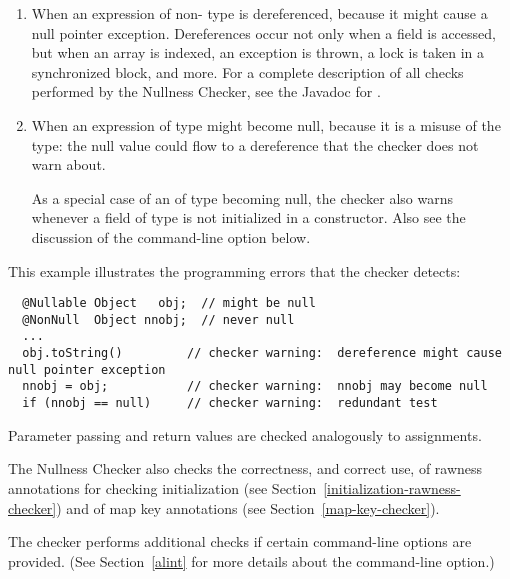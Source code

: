 \begin{enumerate}

\item
  When an expression of non- type
  is dereferenced, because it might cause a null pointer exception.
  Dereferences occur not only when a field is accessed, but when an array
  is indexed, an exception is thrown, a lock is taken in a synchronized
  block, and more.  For a complete description of all checks performed by
  the Nullness Checker, see the Javadoc for
  .

\item
  When an expression of  type
  might become null, because it
  is a misuse of the type:  the null value could flow to a dereference that
  the checker does not warn about.

  As a special case of an of 
  type becoming null, the checker also warns whenever a field of
   type is not initialized in a
  constructor.  Also see the discussion of the 
  command-line option below.

\end{enumerate}

This example illustrates the programming errors that the checker detects:

\begin{Verbatim}
  @Nullable Object   obj;  // might be null
  @NonNull  Object nnobj;  // never null
  ...
  obj.toString()         // checker warning:  dereference might cause null pointer exception
  nnobj = obj;           // checker warning:  nnobj may become null
  if (nnobj == null)     // checker warning:  redundant test
\end{Verbatim}

Parameter passing and return values are checked analogously to assignments.

The Nullness Checker also checks the correctness, and correct use, of
rawness annotations for checking initialization (see
Section~\ref{initialization-rawness-checker}) and of map key annotations (see
Section~\ref{map-key-checker}).


The checker performs additional checks if certain 
command-line options are provided.  (See
Section~\ref{alint} for more details about the 
command-line option.)

